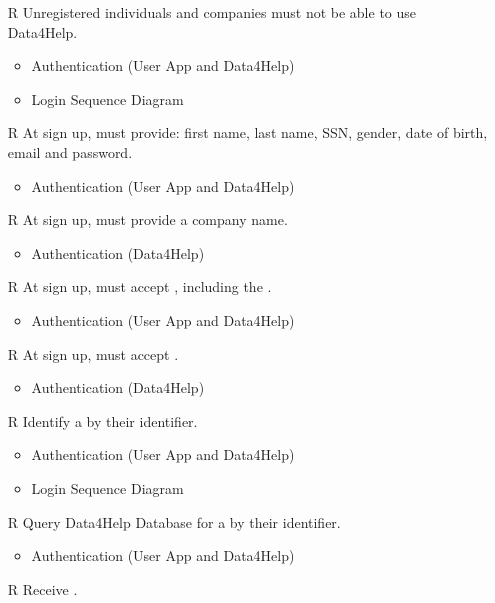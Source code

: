 \begin{itemize}
	\item[R\subs{1}]Unregistered individuals and companies must not be able to use Data4Help.
	\begin{itemize}
		\item Authentication (User App and Data4Help)
		\item Login Sequence Diagram
	\end{itemize}
	\item[R\subs{2}]At sign up,  must provide: first name, last name, SSN, gender, date of birth, email and password.
	\begin{itemize}
		\item Authentication (User App and Data4Help)
	\end{itemize}
	\item[R\subs{3}]At sign up,  must provide a company name.
	\begin{itemize}
		\item Authentication (Data4Help)
	\end{itemize}
	\item[R\subs{4}]At sign up,  must accept , including the .
	\begin{itemize}
		\item Authentication (User App and Data4Help)
	\end{itemize}
	\item[R\subs{5}]At sign up,  must accept .
	\begin{itemize}
		\item Authentication (Data4Help)
	\end{itemize}
	\item[R\subs{6}]Identify a  by their identifier.
	\begin{itemize}
		\item Authentication (User App and Data4Help)
		\item Login Sequence Diagram
	\end{itemize}
	\item[R\subs{7}]Query Data4Help Database for a  by their identifier.
	\begin{itemize}
		\item Authentication (User App and Data4Help)
	\end{itemize}
	\item[R\subs{8}]Receive .
	\begin{itemize}

\end{itemize}
\end{itemize}
